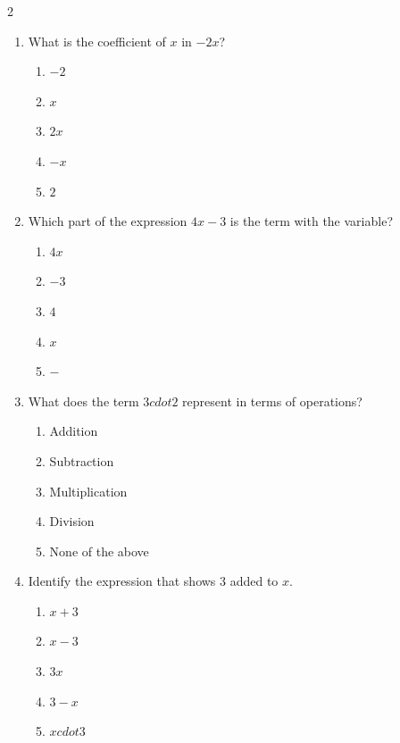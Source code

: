 \documentclass[10pt]{article}
\begin{document}
\begin{multicols}{2}
\begin{enumerate}[label=\textbf{Q\arabic*.}, leftmargin=*, itemsep=6pt, parsep=0pt]
  \item \small What is the coefficient of $x$ in $-2x$?
  \begin{enumerate}[label=(\Alph*), leftmargin=0.6cm, nosep, itemsep=2pt]
    \item $-2$
    \item $x$
    \item $2x$
    \item $-x$
    \item $2$
  \end{enumerate}

  \item \small Which part of the expression $4x - 3$ is the term with the variable?
  \begin{enumerate}[label=(\Alph*), leftmargin=0.6cm, nosep, itemsep=2pt]
    \item $4x$
    \item $-3$
    \item $4$
    \item $x$
    \item $-$
  \end{enumerate}

  \item \small What does the term $3 cdot 2$ represent in terms of operations?
  \begin{enumerate}[label=(\Alph*), leftmargin=0.6cm, nosep, itemsep=2pt]
    \item Addition
    \item Subtraction
    \item Multiplication
    \item Division
    \item None of the above
  \end{enumerate}

  \item \small Identify the expression that shows $3$ added to $x$.
  \begin{enumerate}[label=(\Alph*), leftmargin=0.6cm, nosep, itemsep=2pt]
    \item $x + 3$
    \item $x - 3$
    \item $3x$
    \item $3 - x$
    \item $x cdot 3$
  \end{enumerate}


\end{enumerate}
\end{multicols}
\end{document}
